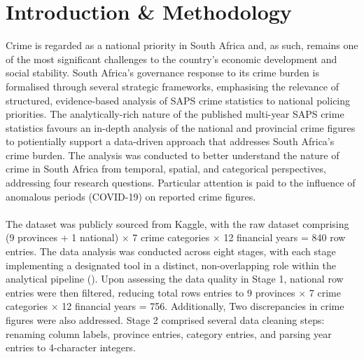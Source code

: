 \documentclass[titlepage, 12pt, oneside]{article}
\begin{document}
\begin{titlepage}
\end{titlepage}

\section*{Introduction \& Methodology}

Crime is regarded as a national priority in South Africa and, as such, remains one of the most significant challenges to the country’s economic development
and social stability. South Africa’s governance response to its crime burden is formalised through several strategic frameworks, emphasising the relevance of structured, evidence-based analysis of SAPS crime statistics to national policing priorities. The analytically-rich nature of the published multi-year SAPS crime statistics favours an in-depth analysis of the national and provincial crime figures to potientially support a data-driven approach that addresses South Africa's crime burden. The analysis was conducted to better understand the nature of crime in South Africa from temporal, spatial, and categorical perspectives, addressing four research questions. Particular attention is paid to the influence of anomalous periods (COVID-19) on reported crime figures.\\\\
The dataset was publicly sourced from Kaggle, with the raw dataset comprising  (9 provinces + 1 national) $\times$ 7 crime categories $\times$ 12 financial years = 840 row entries. The data analysis was conducted across eight stages, with each stage implementing a designated tool in a distinct, non-overlapping role within the analytical pipeline (). Upon assessing the data quality in Stage 1, national row entries were then filtered, reducing total rows entries to 9 provinces $\times$ 7 crime categories $\times$ 12 financial years = 756. Additionally, Two discrepancies in crime figures were also addressed. Stage 2 comprised several data cleaning steps: renaming column labels, province entries, category entries, and parsing year entries to 4-character integers. 

\vspace{\fill}
\end{document}
